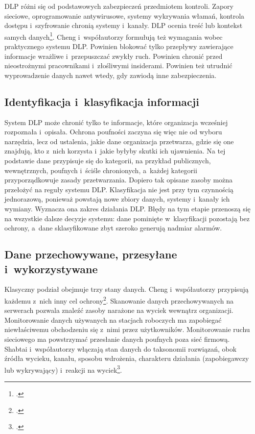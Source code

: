 \documentclass[12pt,a4paper]{article}
\begin{document}
DLP różni się od podstawowych zabezpieczeń przedmiotem kontroli. Zapory
sieciowe, oprogramowanie antywirusowe, systemy wykrywania włamań, kontrola
dostępu i~szyfrowanie chronią systemy i~kanały. DLP ocenia treść lub kontekst
samych danych\footcite{cheng2017enterprise}. Cheng i~współautorzy formułują
też wymagania wobec praktycznego systemu DLP. Powinien blokować tylko
przepływy zawierające informacje wrażliwe i~przepuszczać zwykły ruch.
Powinien chronić przed nieostrożnymi pracownikami i~złośliwymi insiderami.
Powinien też utrudnić wyprowadzenie danych nawet wtedy, gdy zawiodą inne
zabezpieczenia.

\subsection{Identyfikacja i~klasyfikacja informacji}

System DLP może chronić tylko te informacje, które organizacja wcześniej
rozpoznała i~opisała. Ochrona poufności zaczyna się więc nie od wyboru
narzędzia, lecz od ustalenia, jakie dane organizacja przetwarza, gdzie się one
znajdują, kto z~nich korzysta i~jakie byłyby skutki ich ujawnienia. Na tej
podstawie dane przypisuje się do kategorii, na przykład publicznych,
wewnętrznych, poufnych i~ściśle chronionych, a~każdej kategorii
przyporządkowuje zasady przetwarzania. Dopiero tak opisane zasoby można
przełożyć na reguły systemu DLP. Klasyfikacja nie jest przy tym czynnością
jednorazową, ponieważ powstają nowe zbiory danych, systemy i~kanały ich
wymiany. Wyznacza ona zakres działania DLP. Błędy na tym etapie przenoszą się
na wszystkie dalsze decyzje systemu: dane pominięte w~klasyfikacji pozostają
bez ochrony, a~dane sklasyfikowane zbyt szeroko generują nadmiar alarmów.

\subsection{Dane przechowywane, przesyłane i~wykorzystywane}

Klasyczny podział obejmuje trzy stany danych. Cheng i~współautorzy
przypisują każdemu z~nich inny cel ochrony\footcite{cheng2017enterprise}.
Skanowanie danych przechowywanych na serwerach pozwala znaleźć zasoby
narażone na wyciek wewnątrz organizacji. Monitorowanie danych używanych na
stacjach roboczych ma zapobiegać niewłaściwemu obchodzeniu się z~nimi przez
użytkowników. Monitorowanie ruchu sieciowego ma powstrzymać przesłanie danych
poufnych poza sieć firmową. Shabtai i~współautorzy włączają stan danych do
taksonomii rozwiązań, obok źródła wycieku, kanału, sposobu wdrożenia,
charakteru działania (zapobiegawczy lub wykrywający) i~reakcji na
wyciek\footcite{shabtai2012survey}.
\end{document}
